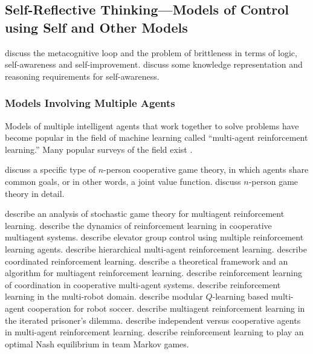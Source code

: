 \subsection{Self-Reflective Thinking---Models of Control using Self and Other Models}

\cite{anderson:2005} discuss the metacognitive loop and the problem of brittleness in terms of logic, self-awareness and self-improvement.
\cite{schubert:2005} discuss some knowledge representation and reasoning requirements for self-awareness.

\subsubsection{Models Involving Multiple Agents}

Models of multiple intelligent agents that work together to solve problems have become popular in the field of machine learning called ``multi-agent reinforcement learning.''
Many popular surveys of the field exist \cite[]{wei:1995} \cite[]{sen:1999} \cite[]{stone:2000} \cite[]{shoham:2004} \cite[]{yang:2004} \cite[]{panait:2005}.

\cite{boutilier:1996} discuss a specific type of $n$-person cooperative game theory, in which agents share common goals, or in other words, a joint value function.
\cite{rapoport:2001} discuss $n$-person game theory in detail.

\cite{bowling:2000} describe an analysis of stochastic game theory for multiagent reinforcement learning.
\cite{claus:1998} describe the dynamics of reinforcement learning in cooperative multiagent systems.
\cite{crites:1998} describe elevator group control using multiple reinforcement learning agents.
\cite{ghavamzadeh:2006} describe hierarchical multi-agent reinforcement learning.
\cite{guestrin:2002} describe coordinated reinforcement learning.
\cite{hu:1998} describe a theoretical framework and an algorithm for multiagent reinforcement learning.
\cite{kapetanakis:2002} describe reinforcement learning of coordination in cooperative multi-agent systems.
\cite{mataric:1997a} describe reinforcement learning in the multi-robot domain.
\cite{park:2001} describe modular $Q$-learning based multi-agent cooperation for robot soccer.
\cite{sandholm:1996} describe multiagent reinforcement learning in the iterated prisoner's dilemma.
\cite{tan:1997} describe independent versus cooperative agents in multi-agent reinforcement learning.
\cite{wang:2003} describe reinforcement learning to play an optimal Nash equilibrium in team Markov games.

